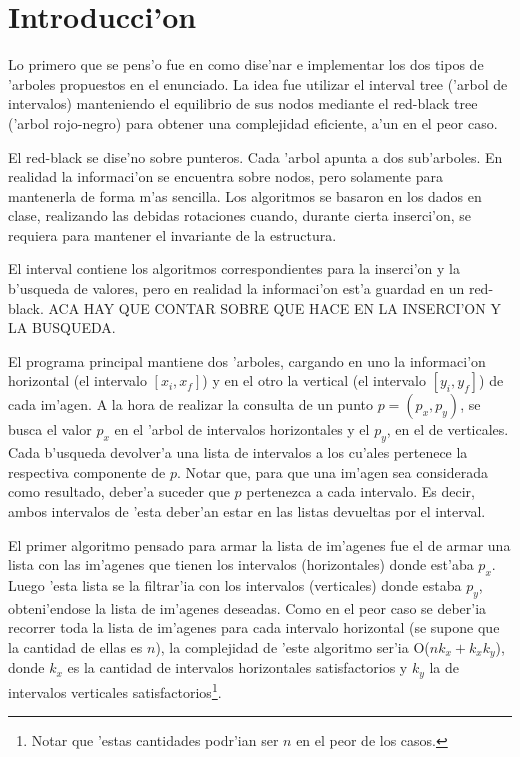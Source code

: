\section{Introducci'on}
Lo primero que se pens'o fue en como dise'nar e implementar los dos tipos de 'arboles propuestos en el enunciado. La idea fue utilizar el interval tree ('arbol de intervalos) manteniendo el equilibrio de sus nodos mediante el red-black tree ('arbol rojo-negro) para obtener una complejidad eficiente, a'un en el peor caso. 

El red-black se dise'no sobre punteros. Cada 'arbol apunta a dos sub'arboles. En realidad la informaci'on se encuentra sobre nodos, pero solamente para mantenerla de forma m'as sencilla. Los algoritmos se basaron en los dados en clase, realizando las debidas rotaciones cuando, durante cierta inserci'on, se requiera para mantener el invariante de la estructura.

El interval contiene los algoritmos correspondientes para la inserci'on y la b'usqueda de valores, pero en realidad la informaci'on est'a guardad en un red-black. ACA HAY QUE CONTAR SOBRE QUE HACE EN LA INSERCI'ON Y LA BUSQUEDA.

El programa principal mantiene dos 'arboles, cargando en uno la informaci'on horizontal (el intervalo $[x_i,x_f]$) y en el otro la vertical (el intervalo $[y_i,y_f]$) de cada im'agen. A la hora de realizar la consulta de un punto $p = (p_x,p_y)$, se busca el valor $p_x$ en el 'arbol de intervalos horizontales y el $p_y$, en el de verticales. Cada b'usqueda devolver'a una lista de intervalos a los cu'ales pertenece la respectiva componente de $p$. Notar que, para que una im'agen sea considerada como resultado, deber'a suceder que $p$ pertenezca a cada intervalo. Es decir, ambos intervalos de 'esta deber'an estar en las listas devueltas por el interval.

El primer algoritmo pensado para armar la lista de im'agenes fue el de armar una lista con las im'agenes que tienen los intervalos (horizontales) donde est'aba $p_x$. Luego 'esta lista se la filtrar'ia con los intervalos (verticales) donde estaba $p_y$, obteni'endose la lista de im'agenes deseadas. Como en el peor caso se deber'ia recorrer toda la lista de im'agenes para cada intervalo horizontal (se supone que la cantidad de ellas es $n$), la complejidad de 'este algoritmo ser'ia O($nk_x+k_xk_y$), donde $k_x$ es la cantidad de intervalos horizontales satisfactorios y $k_y$ la de intervalos verticales satisfactorios\footnote{Notar que 'estas cantidades podr'ian ser $n$ en el peor de los casos.}.

